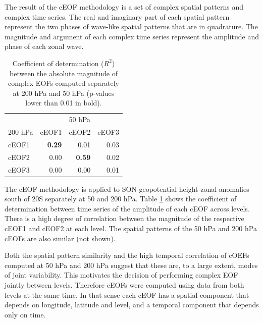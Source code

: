 \documentclass[smallextended]{svjour3}       %
\begin{document}
The result of the cEOF methodology is a set of complex spatial patterns and complex time series.
The real and imaginary part of each spatial pattern represent the two phases of wave-like spatial patterns that are in quadrature.
The magnitude and argument of each complex time series represent the amplitude and phase of each zonal wave.



\begin{table}

\caption{\label{tab:corr-ceof-splitted}Coefficient of determination (\(R^2\)) between the absolute magnitude of complex EOFs computed separately at 200 hPa and 50 hPa (p-values lower than 0.01 in bold).}
\centering
\begin{tabular}[t]{l>{}r>{}r>{}r}
\toprule
\multicolumn{1}{c}{} & \multicolumn{3}{c}{50 hPa} \\
\cmidrule(l{3pt}r{3pt}){2-4}
200 hPa & cEOF1 & cEOF2 & cEOF3\\
\midrule
cEOF1 & \textbf{0.29} & 0.01 & 0.03\\
cEOF2 & 0.00 & \textbf{0.59} & 0.02\\
cEOF3 & 0.00 & 0.00 & 0.01\\
\bottomrule
\end{tabular}
\end{table}

The cEOF methodology is applied to SON geopotential height zonal anomalies south of 20\degree S separately at 50 and 200 hPa.
Table \ref{tab:corr-ceof-splitted} shows the coefficient of determination between time series of the amplitude of each cEOF across levels.
There is a high degree of correlation between the magnitude of the respective cEOF1 and cEOF2 at each level.
The spatial patterns of the 50 hPa and 200 hPa cEOFs are also similar (not shown).

Both the spatial pattern similarity and the high temporal correlation of cOEFs computed at 50 hPa and 200 hPa suggest that these are, to a large extent, modes of joint variability.
This motivates the decision of performing complex EOF jointly between levels.
Therefore cEOFs were computed using data from both levels at the same time.
In that sense each cEOF has a spatial component that depends on longitude, latitude and level, and a temporal component that depends only on time.
\end{document}
